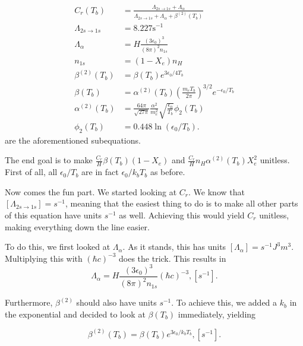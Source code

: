 \documentclass[12pt]{article}
\begin{document}
\begin{align*}\label{eq: peebles components again}
        C_{r}\left(T_{b}\right) &=\frac{\Lambda_{2 s \rightarrow 1 s}+\Lambda_{\alpha}}{\Lambda_{2 s \rightarrow 1 s}+\Lambda_{\alpha}+\beta^{(2)}\left(T_{b}\right)} \\
        \Lambda_{2 s \rightarrow 1 s} &=8.227 \mathrm{s}^{-1} \\
        \Lambda_{\alpha} &=H \frac{\left(3 \epsilon_{0}\right)^{3}}{(8 \pi)^{2} n_{1 s}} \\
        n_{1 s} &=\left(1-X_{e}\right) n_{H} \\
        \beta^{(2)}\left(T_{b}\right) &=\beta\left(T_{b}\right) e^{3 \epsilon_{0} / 4 T_{b}} \\
        \beta\left(T_{b}\right) &=\alpha^{(2)}\left(T_{b}\right)\left(\frac{m_{e} T_{b}}{2 \pi}\right)^{3 / 2} e^{-\epsilon_{0} / T_{b}} \\
        \alpha^{(2)}\left(T_{b}\right) &=\frac{64 \pi}{\sqrt{27 \pi}} \frac{\alpha^{2}}{m_{e}^{2}} \sqrt{\frac{\epsilon_{0}}{T_{b}}} \phi_{2}\left(T_{b}\right) \\
        \phi_{2}\left(T_{b}\right) &=0.448 \ln \left(\epsilon_{0} / T_{b}\right).
\end{align*}
are the aforementioned subequations.

The end goal is to make $\frac{C_r}{H}\beta(T_b)(1-X_e)$ and $\frac{C_r}{H}n_H\alpha^{(2)}(T_b)X_e^2$ unitless. First of all, all $\epsilon_0/T_b$ are in fact $\epsilon_0/k_b T_b$ as before. 

Now comes the fun part. We started looking at $C_r$. We know that $[\Lambda_{2s\rightarrow1s}] = s^{-1}$, meaning that the easiest thing to do is to make all other parts of this equation have units $s^{-1}$ as well. Achieving this would yield $C_r$ unitless, making everything down the line easier. 

To do this, we first looked at $\Lambda_{\alpha}$. As it stands, this has units $[\Lambda_{\alpha}]=s^{-1}J^3m^3$. Multiplying this with $(\hbar c)^{-3}$ does the trick. This results in 
\begin{equation*}
    \Lambda_{\alpha}= H\frac{(3\epsilon_0)^3}{(8\pi)^2 n_{1s}}(\hbar c)^{-3}, [s^{-1}].
\end{equation*}

Furthermore, $\beta^{(2)}$ should also have units $s^{-1}$. To achieve this, we added a $k_b$ in the exponential and decided to look at $\beta(T_b)$ immediately, yielding 

\begin{equation*}
    \beta^{(2)}(T_b) = \beta(T_b)e^{3\epsilon_0/k_bT_b}, [s^{-1}].
\end{equation*}
\end{document}
